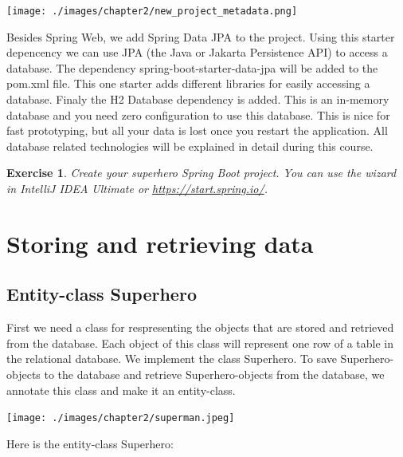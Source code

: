 \documentclass[a4paper, 12pt]{report}
\newenvironment{boxexercise}
{\begin{tcolorbox}
[enhanced jigsaw,breakable,pad at break*=1mm,
 colback=tsyellow!20,boxrule=0pt,frame hidden]}
{\end{tcolorbox}}
\newtheorem{envoefening}{\textbf{Exercise}}[chapter]
\newenvironment{oefening}
               {\begin{boxexercise}\begin{envoefening}}
               {\end{envoefening}\end{boxexercise}}
\begin{document}
\texttt{[image: ./images/chapter2/new\_project\_metadata.png]}

Besides Spring Web, we add Spring Data JPA to the project. Using this starter depencency we can use JPA (the Java or Jakarta Persistence API) to access a database. 
The dependency spring-boot-starter-data-jpa will be added to the pom.xml file. This one starter adds different libraries for easily accessing a database.
Finaly the H2 Database dependency is added. This is an in-memory database 
and you need zero configuration to use this database. This is nice for fast prototyping, but all your data is lost once you restart the application. All database related technologies will be explained in detail during this course. 

\begin{oefening}
Create your superhero Spring Boot project. You can use the wizard in IntelliJ IDEA Ultimate or \url{https://start.spring.io/}.
\end{oefening}

\section{Storing and retrieving data}

\subsection{Entity-class Superhero}

First we need a class for respresenting the objects that are stored and retrieved from the database. Each object of this class will represent one row of a table in the relational database.
We implement the class Superhero. To save Superhero-objects to the database and retrieve Superhero-objects from the database, we annotate this class and make it an entity-class. 

\texttt{[image: ./images/chapter2/superman.jpeg]} 

Here is the entity-class Superhero:
\end{document}
